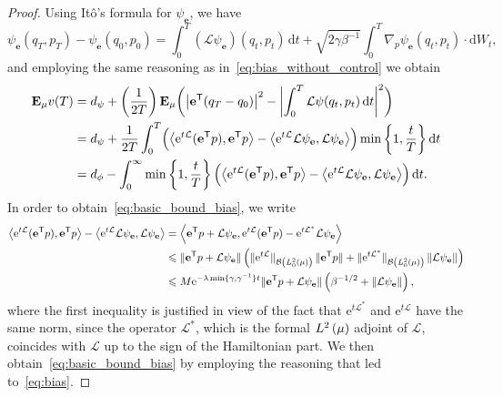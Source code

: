 \documentclass[11pt,a4paper]{article}
\newcommand{\e}{\mathrm{e}}
\newcommand{\expect}[0]{\mathbf{E}}
\newcommand{\grad}{\nabla}
\newcommand{\vect}[1]{\boldsymbol{\mathbf #1}}
\renewcommand{\d}{\mathrm d}
\renewcommand{\t}{\mathsf T}
\theoremstyle{plain}
\numberwithin{equation}{section}
\renewcommand{\leq}{\leqslant}
\begin{document}
\begin{proof}
Using Itô's formula for $\psi_{\vect e}$,
we have
\[
    \psi_{\vect e}(q_T, p_T) - \psi_{\vect e}(q_0, p_0)
    = \int_{0}^{T} (\mathcal L \psi_{\vect e}) (q_t, p_t) \, \d t + \sqrt{2 \gamma \beta^{-1}} \int_{0}^{T} \grad_p \psi_{\vect e} (q_t, p_t) \cdot \d W_t,
\]
and employing the same reasoning as in~\eqref{eq:bias_without_control} we obtain
\begin{align*}
    \expect_{\mu} v(T)
    &= d_{\psi} + \left( \frac{1}{2T} \right) \expect_{\mu} \biggl( \abs{\vect e^\t (q_T - q_0)}^2 - \biggl| \int_0^T {\mathcal L \psi}(q_t, p_t) \, \d t \biggr|^2 \biggr) \\
    &= d_{\psi} +  \frac{1}{2T}  \int_{0}^{T} \Bigl( \ip{\e^{t \mathcal L}(\vect e^\t p)}{\vect e^\t p} - \ip{\e^{t \mathcal L} \mathcal L \psi_{\vect e}}{\mathcal L \psi_{\vect e}} \Bigr) \min\left\{1, \frac{t}{T}\right\} \d t \\
    &= d_{\phi} - \int_{0}^{\infty} \min\left\{1, \frac{t}{T}\right\} \Bigl( \ip{\e^{t \mathcal L}(\vect e^\t p)}{\vect e^\t  p} - \ip{\e^{t \mathcal L} \mathcal L \psi_{\vect e}}{\mathcal L \psi_{\vect e}} \Bigr) \, \d t.
\end{align*}
In order to obtain~\eqref{eq:basic_bound_bias}, we write
\begin{align*}
    \ip{\e^{t \mathcal L}(\vect e^\t p)}{\vect e^\t p} - \ip{\e^{t \mathcal L} \mathcal L \psi_{\vect e}}{\mathcal L \psi_{\vect e}}
    &= \ip{\vect e^\t p + \mathcal L \psi_{\vect e}}{\e^{t \mathcal L} (\vect e^\t p) - \e^{t \mathcal L^*} \mathcal  L\psi_{\vect e}} \\
    &\leq \norm*{\vect e^\t p + \mathcal L \psi_{\vect e}}
    \left( \norm*{\e^{t \mathcal L}}[\mathcal B\left(L^2_0(\mu) \right)] \, \norm*{\vect e^\t p} + \norm*{\e^{t \mathcal L^*}}[\mathcal B\left(L^2_0(\mu) \right)] \norm{\mathcal L \psi_{\vect e}} \right) \\
    &\leq M \e^{- \lambda \min\{\gamma, \gamma^{-1}\} t} \norm*{\vect e^\t p + \mathcal L\psi_{\vect e}}  \left(\beta^{-1/2} + \norm{\mathcal L \psi_{\vect e}} \right),
\end{align*}
where the first inequality is justified in view of the fact that $\e^{t \mathcal L^*}$ and $\e^{t \mathcal L}$ have the same norm,
since the operator $\mathcal L^*$, which is the formal $\lp{2}{\mu}$ adjoint of $\mathcal L$,
coincides with $\mathcal L$ up to the sign of the Hamiltonian part.
We then obtain~\eqref{eq:basic_bound_bias} by employing the reasoning that led to~\eqref{eq:bias}.


\end{proof}
\end{document}

